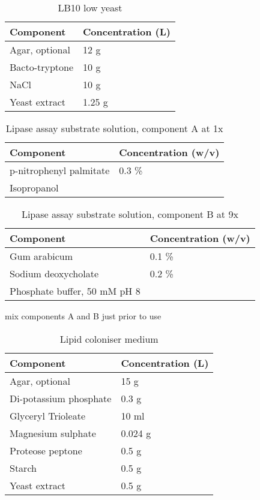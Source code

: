 \documentclass[11pt]{article}
\begin{document}
\begin{table}
\caption{LB10 low yeast}
\begin{tabular}{  p{6.9cm} | p{6.9cm} }
\hline
Component & Concentration (L) \\
\hline
 Agar, optional & 12 g  \\
Bacto-tryptone    & 10 g  \\
   NaCl   & 10 g  \\
    Yeast extract    & 1.25 g \\
  \hline
\end{tabular}
\end{table}

\begin{table}
\caption{Lipase assay substrate solution, component A at 1x}
\begin{tabular}{  p{6.9cm} | p{6.9cm} }
\hline
Component & Concentration (w/v) \\
\hline
 p-nitrophenyl palmitate   & 0.3 \% \\
 Isopropanol &  \\
 \hline
\end{tabular}
\end{table}

\begin{table}
\caption{Lipase assay substrate solution, component B at 9x}
\begin{tabular}{  p{6.9cm} | p{6.9cm} }
\hline
Component & Concentration (w/v) \\
\hline
 Gum arabicum & 0.1 \% \\
  Sodium deoxycholate & 0.2 \% \\
  Phosphate buffer, 50 mM pH 8   &  \\
  \hline
\end{tabular}
\end{table}

mix components A and B just prior to use

\begin{table}
\caption{Lipid coloniser medium}
\begin{tabular}{  p{6.9cm} | p{6.9cm} }
\hline
Component & Concentration (L) \\
\hline
Agar, optional  & 15 g  \\
  Di-potassium phosphate  & 0.3 g \\
   Glyceryl Trioleate   & 10 ml \\
      Magnesium sulphate  & 0.024 g  \\
       Proteose peptone   & 0.5 g \\
          Starch  & 0.5 g \\
           Yeast extract   & 0.5 g \\
  \hline
\end{tabular}
\end{table}
\end{document}
